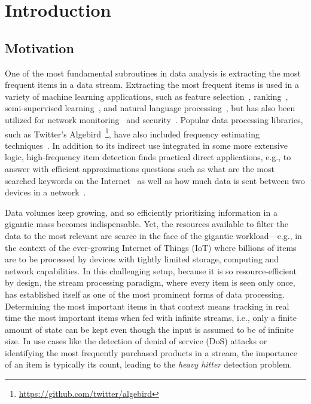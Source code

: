 
\chapter{Introduction}
\label{chapter:introduction}

\section{Motivation}

One of the most fundamental subroutines in data analysis is extracting the most frequent items in a data stream. Extracting the most frequent items is used in a variety of machine learning applications, such as feature selection~\cite{thoma2009near}, ranking~\cite{popescu2011text}, semi-supervised learning~\cite{ahmed2015semi}, and natural language processing~\cite{chowdhury2003natural}, but has also been utilized for network monitoring~\cite{li2010mining} and security~\cite{paredes2010automating}. Popular data processing libraries, such as Twitter's Algebird~\footnote{\url{https://github.com/twitter/algebird}}, have also included frequency estimating techniques~\cite{deng2007new}. In addition to its indirect use integrated in some more extensive logic, high-frequency item detection finds practical direct applications, e.g., to answer with efficient approximations  questions such as what are the most searched keywords on the Internet~\cite{rovetta2020covid} as well as how much data is sent between two devices in a network~\cite{mistry2016network}.

Data volumes keep growing, and so efficiently prioritizing information in a gigantic mass becomes indispensable. Yet, the resources available to filter the data to the most relevant are scarce in the face of the gigantic workload---e.g., in the context of the ever-growing Internet of Things (IoT) where billions of items are to be processed by devices with tightly limited storage, computing and network capabilities.
% 
In this challenging setup, because it is so resource-efficient by design, the stream processing paradigm, where every item is seen only once, has established itself as one of the most prominent forms of data processing. Determining the most important items in that context means tracking in real time the most important items when fed with infinite streams, i.e., only a finite amount of state can be kept even though the input is assumed to be of infinite size.
% 
In use cases like the detection of denial of service (DoS) attacks or identifying the most frequently purchased products in a stream, the importance of an item is typically its count, leading to the \emph{heavy hitter} detection problem.

